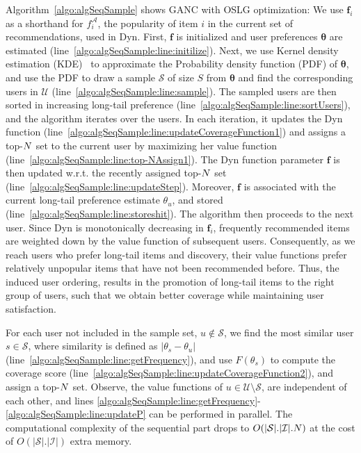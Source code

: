 Algorithm~\ref{algo:algSeqSample} shows GANC with OSLG optimization:  We use $\mathbf{f}_i$ as a shorthand for $f_i^{\mathcal{A}}$, the  popularity of item $i$ in the current set of recommendations, used in Dyn. First, $\mathbf{f}$ is initialized and user preferences $\bm{\theta}$ are estimated (line~\ref{algo:algSeqSample:line:initilize}). Next, we  use  Kernel density estimation (KDE)~\cite{sheather1991reliable} to approximate the Probability density function (PDF) of $\bm{\theta}$, and use the PDF to draw a sample $\mathcal{S}$ of size $S$ from $\bm{\theta}$ and find the corresponding users in $\mathcal{U}$ (line~\ref{algo:algSeqSample:line:sample}). The sampled users are then sorted in increasing long-tail preference (line~\ref{algo:algSeqSample:line:sortUsers}), and the algorithm iterates over the users. In each iteration, it updates the Dyn function (line~\ref{algo:algSeqSample:line:updateCoverageFunction1}) and assigns a top-$N$ set  to the current user by maximizing her value function (line~\ref{algo:algSeqSample:line:top-NAssign1}). The Dyn function parameter  $\mathbf{f}$ is then updated w.r.t. the recently assigned top-$N$ set (line~\ref{algo:algSeqSample:line:updateStep}). Moreover, $\mathbf{f}$ is associated with the current long-tail preference estimate $\theta_u$, and stored (line~\ref{algo:algSeqSample:line:storeshit}). The algorithm then proceeds to the next user. Since Dyn  is monotonically decreasing in $\mathbf{f}_i$, frequently recommended items are weighted down by the value function of subsequent users. Consequently, as we reach users who prefer long-tail items and discovery, their value functions prefer relatively unpopular items that have not been recommended before. Thus, the induced user ordering, results in the promotion of long-tail items to the right group of users, such that we obtain better coverage while maintaining user satisfaction.

 For each user not included in the sample set, $u \not\in \mathcal{S}$, we find the most similar user $s \in \mathcal{S}$, where similarity  is defined as $|\theta_s-\theta_u|$ (line~\ref{algo:algSeqSample:line:getFrequency}), and use $F(\theta_s)$ to compute the coverage score (line~\ref{algo:algSeqSample:line:updateCoverageFunction2}), and assign a top-$N$ set. Observe,  the value functions of $u \in \mathcal{U} \setminus \mathcal{S}$, are independent of each other, and  lines	\ref{algo:algSeqSample:line:getFrequency}-\ref{algo:algSeqSample:line:updateP}  can be performed in parallel. The computational complexity of the sequential part drops to $O(\vert \mathcal{S} \vert . \vert \mathcal{I}\vert . N)$ at the  cost of  $O(\vert \mathcal{S} \vert . \vert \mathcal{I}\vert )$ extra memory.


\iffalse
\begin{align*}
\texttt{Pref. Model}_{\texttt{Acc. Rec.}}^{\texttt{Cov. Rec.}}
\end{align*}
\fi
